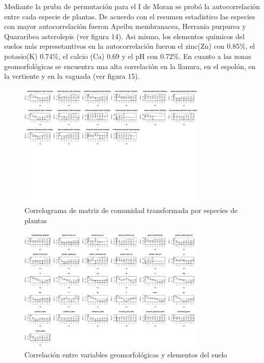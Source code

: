 \documentclass[11pt,]{article}
\begin{document}
Mediante la pruba de permutación para el I de Moran se probó la
autocorrelación entre cada especie de plantas. De acuerdo con el resumen
estadistico las especies con mayor autocorrelación fueron Apeiba
membranacea, Herrania purpurea y Quararibea asterolepis (ver figura 14).
Asi mismo, los elementos quimicos del suelos más represetantivos en la
autocorrelación fueron el zinc(Zn) con 0.85\%, el potasio(K) 0.74\%, el
calcio (Ca) 0.69 y el pH con 0.72\%. En cuanto a las zonas
geomorfológicas se encuentra una alta correlación en la llanura, en el
espolón, en la vertiente y en la vaguada (ver figura 15).

\begin{figure}
\centering
\includegraphics[width=0.80000\textwidth]{correlograma_matriz_de_comunidad_transformda.jpg}
\caption{Correlograma de matriz de comunidad transformada por especies
de plantas}
\end{figure}

\begin{figure}
\centering
\includegraphics[width=0.80000\textwidth]{correlacion_matriz_comunidad_geomorofologicas_variables_suelo.jpg}
\caption{Correlación entre variables geomorfológicas y elementos del
suelo}
\end{figure}
\end{document}
